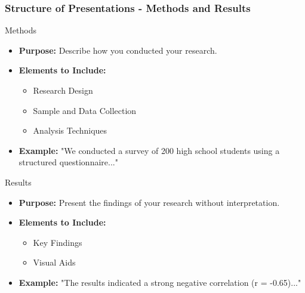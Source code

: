 \documentclass[aspectratio=169]{beamer}
\begin{document}
\begin{frame}[fragile]
    \frametitle{Structure of Presentations - Methods and Results}
    \begin{block}{Methods}
        \begin{itemize}
            \item \textbf{Purpose:} Describe how you conducted your research.
            \item \textbf{Elements to Include:}
                \begin{itemize}
                    \item Research Design
                    \item Sample and Data Collection
                    \item Analysis Techniques
                \end{itemize}
            \item \textbf{Example:} 
                "We conducted a survey of 200 high school students using a structured questionnaire..."
        \end{itemize}
    \end{block}
    
    \begin{block}{Results}
        \begin{itemize}
            \item \textbf{Purpose:} Present the findings of your research without interpretation.
            \item \textbf{Elements to Include:}
                \begin{itemize}
                    \item Key Findings
                    \item Visual Aids
                \end{itemize}
            \item \textbf{Example:} 
                "The results indicated a strong negative correlation (r = -0.65)..."
        \end{itemize}
    \end{block}
\end{frame}
\end{document}
